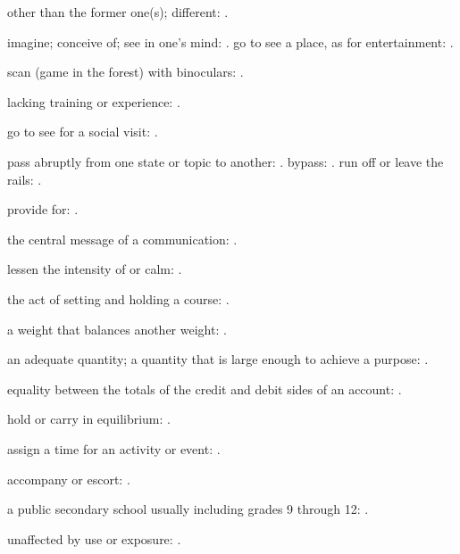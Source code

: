   other than the former one(s); different: .

  imagine; conceive of; see in one's mind:   . go to see a place, as for entertainment:   .

  scan (game in the forest) with binoculars: .

  lacking training or experience:   .

  go to see for a social visit: .

  pass abruptly from one state or topic to another:   . bypass:   . run off or leave the rails:   .

  provide for: .

  the central message of a communication: .

  lessen the intensity of or calm:   .

  the act of setting and holding a course:   .

  a weight that balances another weight:   .

  an adequate quantity; a quantity that is large enough to achieve a purpose: .

  equality between the totals of the credit and debit sides of an account: .

  hold or carry in equilibrium:   .

  assign a time for an activity or event: .

  accompany or escort:   .

  a public secondary school usually including grades 9 through 12:   .

  unaffected by use or exposure: .

